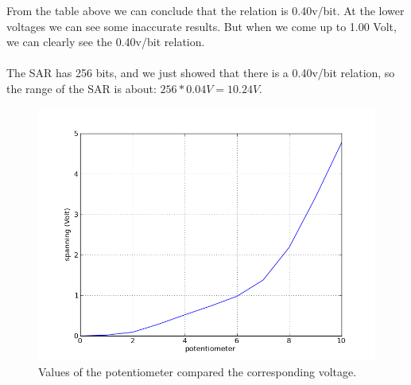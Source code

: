 \documentclass[a4paper, 12pt, titlepage]{article}
\begin{document}
From the table above we can conclude that the relation is 0.40v/bit. At the
lower voltages we can see some inaccurate results. But when we come up to 
1.00 Volt, we can clearly see the 0.40v/bit relation. \\
\\
The SAR has 256 bits, and we just showed that there is a 0.40v/bit relation, 
so the range of the SAR is about: $256 * 0.04V = 10.24
V$.

\begin{figure}[H]
\includegraphics[width=12cm]{plot.png}
\caption{Values of the potentiometer compared the corresponding voltage.}
\end{figure}
\end{document}
